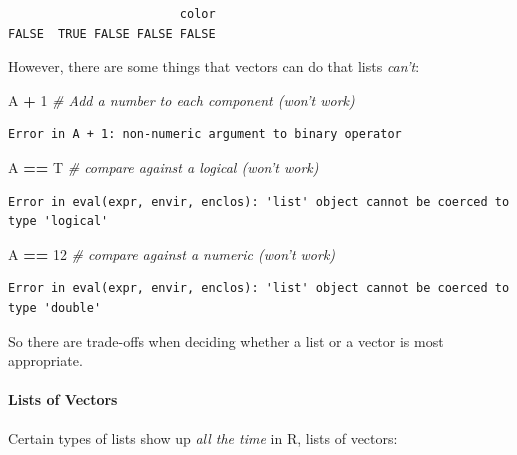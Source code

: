 \documentclass[
]{article}
\newenvironment{Shaded}{\begin{snugshade}}{\end{snugshade}}
\newcommand{\CommentTok}[1]{\textcolor[rgb]{0.56,0.35,0.01}{\textit{#1}}}
\newcommand{\DecValTok}[1]{\textcolor[rgb]{0.00,0.00,0.81}{#1}}
\newcommand{\NormalTok}[1]{#1}
\newcommand{\OperatorTok}[1]{\textcolor[rgb]{0.81,0.36,0.00}{\textbf{#1}}}
\newcommand{\StringTok}[1]{\textcolor[rgb]{0.31,0.60,0.02}{#1}}
\begin{document}
\begin{verbatim}
                        color 
FALSE  TRUE FALSE FALSE FALSE 
\end{verbatim}

However, there are some things that vectors can do that lists \emph{can't}:

\begin{Shaded}
\begin{Highlighting}[]
\NormalTok{A }\OperatorTok{+}\StringTok{ }\DecValTok{1}  \CommentTok{# Add a number to each component (won't work)}
\end{Highlighting}
\end{Shaded}

\begin{verbatim}
Error in A + 1: non-numeric argument to binary operator
\end{verbatim}

\begin{Shaded}
\begin{Highlighting}[]
\NormalTok{A }\OperatorTok{==}\StringTok{ }\NormalTok{T  }\CommentTok{# compare against a logical (won't work)}
\end{Highlighting}
\end{Shaded}

\begin{verbatim}
Error in eval(expr, envir, enclos): 'list' object cannot be coerced to type 'logical'
\end{verbatim}

\begin{Shaded}
\begin{Highlighting}[]
\NormalTok{A }\OperatorTok{==}\StringTok{ }\DecValTok{12}  \CommentTok{# compare against a numeric (won't work)}
\end{Highlighting}
\end{Shaded}

\begin{verbatim}
Error in eval(expr, envir, enclos): 'list' object cannot be coerced to type 'double'
\end{verbatim}

So there are trade-offs when deciding whether a list or a vector is most appropriate.

\hypertarget{lists-of-vectors}{%
\paragraph{Lists of Vectors}\label{lists-of-vectors}}

Certain types of lists show up \emph{all the time} in R, lists of vectors:
\end{document}
